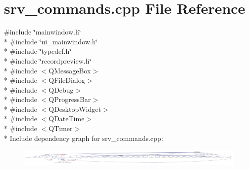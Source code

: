 \hypertarget{a00134}{\section{srv\+\_\+commands.\+cpp File Reference}
\label{a00134}
}
{\ttfamily \#include \char`\"{}mainwindow.\+h\char`\"{}}\\*
{\ttfamily \#include \char`\"{}ui\+\_\+mainwindow.\+h\char`\"{}}\\*
{\ttfamily \#include \char`\"{}typedef.\+h\char`\"{}}\\*
{\ttfamily \#include \char`\"{}recordpreview.\+h\char`\"{}}\\*
{\ttfamily \#include $<$Q\+Message\+Box$>$}\\*
{\ttfamily \#include $<$Q\+File\+Dialog$>$}\\*
{\ttfamily \#include $<$Q\+Debug$>$}\\*
{\ttfamily \#include $<$Q\+Progress\+Bar$>$}\\*
{\ttfamily \#include $<$Q\+Desktop\+Widget$>$}\\*
{\ttfamily \#include $<$Q\+Date\+Time$>$}\\*
{\ttfamily \#include $<$Q\+Timer$>$}\\*
Include dependency graph for srv\+\_\+commands.\+cpp\+:
\nopagebreak
\begin{figure}[H]
\begin{center}
\leavevmode
\includegraphics[width=350pt]{d6/d9c/a00352}
\end{center}
\end{figure}
